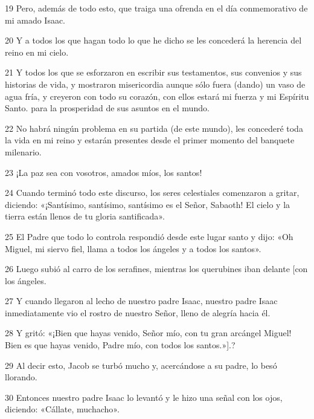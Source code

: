 \par 19 Pero, además de todo esto, que traiga una ofrenda en el día conmemorativo de mi amado Isaac.

\par 20 Y a todos los que hagan todo lo que he dicho se les concederá la herencia del reino en mi cielo.

\par 21 Y todos los que se esforzaron en escribir sus testamentos, sus convenios y sus historias de vida, y mostraron misericordia aunque sólo fuera (dando) un vaso de agua fría, y creyeron con todo su corazón, con ellos estará mi fuerza y ​​mi Espíritu Santo. para la prosperidad de sus asuntos en el mundo.

\par 22 No habrá ningún problema en su partida (de este mundo), les concederé toda la vida en mi reino y estarán presentes desde el primer momento del banquete milenario.

\par 23 ¡La paz sea con vosotros, amados míos, los santos!

\par 24 Cuando terminó todo este discurso, los seres celestiales comenzaron a gritar, diciendo: «¡Santísimo, santísimo, santísimo es el Señor, Sabaoth! El cielo y la tierra están llenos de tu gloria santificada».

\par 25 El Padre que todo lo controla respondió desde este lugar santo y dijo: «Oh Miguel, mi siervo fiel, llama a todos los ángeles y a todos los santos».

\par 26 Luego subió al carro de los serafines, mientras los querubines iban delante [con los ángeles.

\par 27 Y cuando llegaron al lecho de nuestro padre Isaac, nuestro padre Isaac inmediatamente vio el rostro de nuestro Señor, lleno de alegría hacia él.

\par 28 Y gritó: «¡Bien que hayas venido, Señor mío, con tu gran arcángel Miguel! Bien es que hayas venido, Padre mío, con todos los santos.»].?

\par 29 Al decir esto, Jacob se turbó mucho y, acercándose a su padre, lo besó llorando.

\par 30 Entonces nuestro padre Isaac lo levantó y le hizo una señal con los ojos, diciendo: «Cállate, muchacho».

